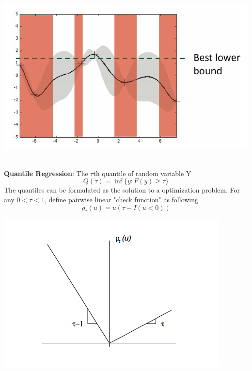 \documentclass[a0,portrait]{a0poster}
\begin{document}
\begin{multicols}{2}
\begin{center}
    \includegraphics[width=\columnwidth]{fig/GPUCB.png}
    \label{fig:3settings}
\end{center}\\
\textbf{Quantile Regression}: The $\tau$th quantile of random variable Y
$$Q(\tau) = \inf\{y: F(y) \geq \tau\}$$
The quantiles can be formulated as the solution to a optimization problem. For any $0 < \tau < 1$, define pairwise linear "check function" as following \cite{koenker2001quantile}
$$\rho_\tau(u) = u(\tau - I(u<0))$$
\begin{center}
    \includegraphics[width=\columnwidth]{fig/quant.png}
    \label{fig:quant}
\end{center}\\

\end{multicols}
\end{document}
